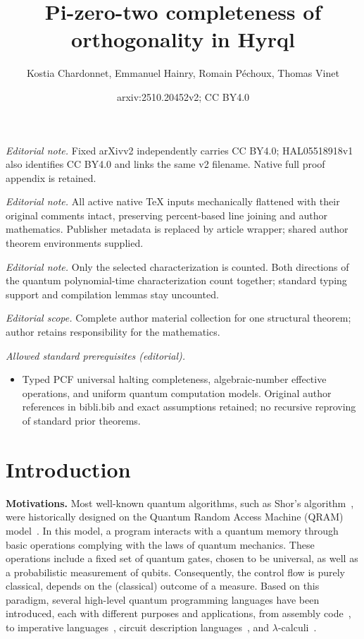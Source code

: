 \documentclass[10pt,a4paper]{article}
\title{Pi-zero-two completeness of orthogonality in Hyrql}
\author{Kostia Chardonnet, Emmanuel Hainry, Romain Péchoux, Thomas Vinet}
\date{arxiv:2510.20452v2; CC BY4.0}
\newcommand{\ie}{\text{i.e., }}
\begin{document}
\maketitle
\noindent\textit{Editorial note.} Fixed arXivv2 independently carries CC BY4.0; HAL05518918v1 also identifies CC BY4.0 and links the same v2 filename. Native full proof appendix is retained.\par\medskip
\noindent\textit{Editorial note.} All active native TeX inputs mechanically flattened with their original comments intact, preserving percent-based line joining and author mathematics. Publisher metadata is replaced by article wrapper; shared author theorem environments supplied.\par\medskip
\noindent\textit{Editorial note.} Only the selected characterization is counted. Both directions of the quantum polynomial-time characterization count together; standard typing support and compilation lemmas stay uncounted.\par\medskip
\noindent\textit{Editorial scope.} Complete author material collection for one structural theorem; author retains responsibility for the mathematics.\par\medskip
\noindent\textit{Allowed standard prerequisites (editorial).}\begin{itemize}
\item Typed PCF universal halting completeness, algebraic-number effective operations, and uniform quantum computation models. Original author references in bibli.bib and exact assumptions retained; no recursive reproving of standard prior theorems.
\end{itemize}\medskip
\section{Introduction}
\label{sec:intro}

\textbf{Motivations. }
Most well-known quantum algorithms, such as Shor's algorithm~\cite{Sho97}, were
historically designed on the Quantum Random Access Machine (QRAM)
model~\cite{Kni22}. In this model, a program
interacts with a quantum memory through basic operations complying with the
laws of quantum mechanics. These operations include a fixed set of quantum
gates, chosen to be universal, as well as a probabilistic measurement of
qubits. Consequently, the control flow is purely classical, \ie depends on the
(classical) outcome of a measure. Based on  this paradigm, several high-level
quantum programming languages have been introduced, each with different
purposes and applications, from assembly code~\cite{QASM17,QASM22}, to
imperative languages~\cite{FY21}, circuit description languages~\cite{GLRSV13},
and $\lambda$-calculi~\cite{SV09}.
\end{document}
